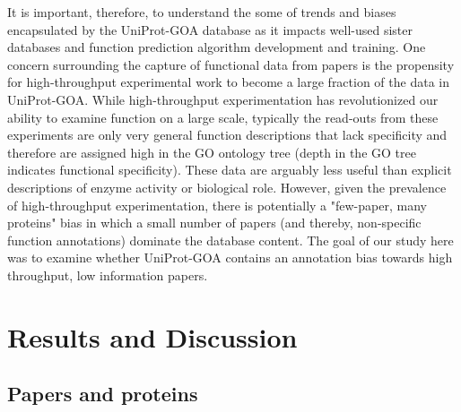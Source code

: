 \documentclass[10pt]{bmc_article}
\newenvironment{bmcformat}{\begin{raggedright}\baselineskip20pt\sloppy\setboolean{publ}{false}}{\end{raggedright}\baselineskip20pt\sloppy}
\begin{document}
\begin{bmcformat}
It is important, therefore, to understand the some of trends and biases
encapsulated by the UniProt-GOA database as it impacts well-used sister
databases and function prediction algorithm development and training. One
concern surrounding the capture of functional data from papers is the
propensity for high-throughput experimental work to become a large fraction of
the data in UniProt-GOA. While high-throughput experimentation has
revolutionized our ability to examine function on a large scale, typically the
read-outs from these experiments are only very general function descriptions
that lack specificity and therefore are assigned high in the GO ontology tree
(depth in the GO tree indicates functional specificity). These data are
arguably less useful than explicit descriptions of enzyme activity or
biological role. However, given the prevalence of high-throughput
experimentation, there is potentially a "few-paper, many proteins" bias in
which a small number of papers (and thereby, non-specific function annotations)
dominate the database content. The goal of our study here was to examine
whether UniProt-GOA contains an annotation bias towards high throughput, low
information papers. 

 
\section*{Results and Discussion}
  \subsection*{Papers and proteins}


\end{bmcformat}
\end{document}
